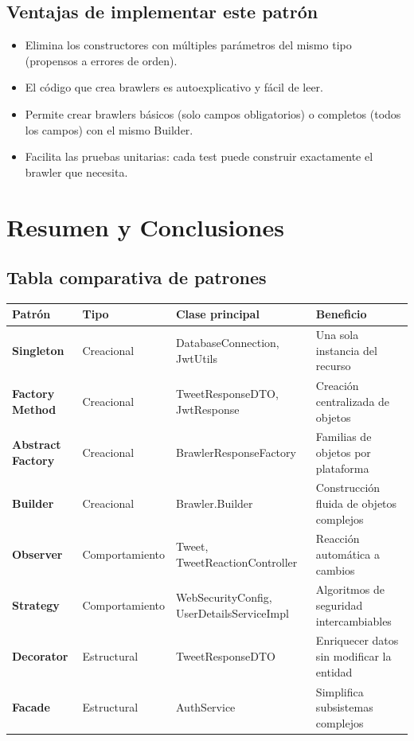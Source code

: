 \documentclass[12pt,a4paper]{article}
\begin{document}
\subsection{Ventajas de implementar este patr\'on}
\begin{itemize}
  \item Elimina los constructores con m\'ultiples par\'ametros del mismo tipo (propensos a errores de orden).
  \item El c\'odigo que crea brawlers es autoexplicativo y f\'acil de leer.
  \item Permite crear brawlers b\'asicos (solo campos obligatorios) o completos (todos los campos) con el mismo Builder.
  \item Facilita las pruebas unitarias: cada test puede construir exactamente el brawler que necesita.
\end{itemize}


\newpage
\section{Resumen y Conclusiones}

\subsection{Tabla comparativa de patrones}

\begin{center}
\begin{tabular}{|>{\bfseries}p{2.8cm}|p{2cm}|p{4cm}|p{4cm}|}
\hline
\rowcolor{bsDark!15} Patr\'on & Tipo & Clase principal & Beneficio \\
\hline
Singleton & Creacional & DatabaseConnection, JwtUtils & Una sola instancia del recurso \\
\hline
Factory Method & Creacional & TweetResponseDTO, JwtResponse & Creaci\'on centralizada de objetos \\
\hline
Abstract Factory & Creacional & BrawlerResponseFactory & Familias de objetos por plataforma \\
\hline
Builder & Creacional & Brawler.Builder & Construcci\'on fluida de objetos complejos \\
\hline
Observer & Comportamiento & Tweet, TweetReactionController & Reacci\'on autom\'atica a cambios \\
\hline
Strategy & Comportamiento & WebSecurityConfig, UserDetailsServiceImpl & Algoritmos de seguridad intercambiables \\
\hline
Decorator & Estructural & TweetResponseDTO & Enriquecer datos sin modificar la entidad \\
\hline
Facade & Estructural & AuthService & Simplifica subsistemas complejos \\
\hline
\end{tabular}
\end{center}
\end{document}
